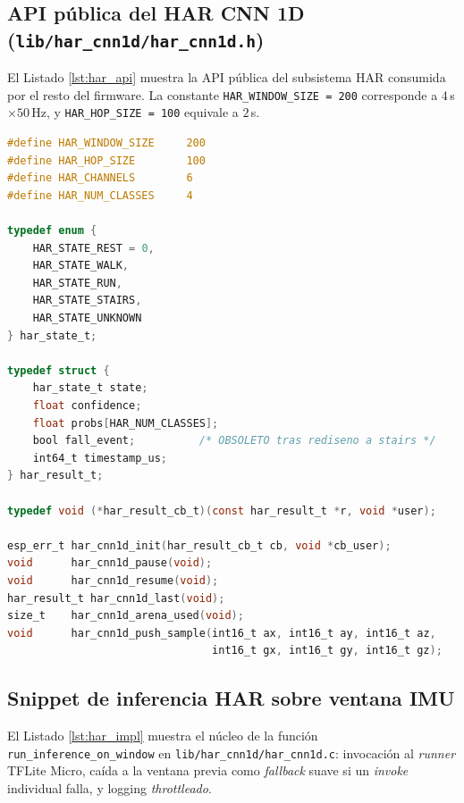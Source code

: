 \documentclass[letterpaper,11pt]{article}
\begin{document}
\subsection{API p\'ublica del HAR CNN 1D (\texttt{lib/har\_cnn1d/har\_cnn1d.h})}\label{sec:anexo_har_api}

El Listado \ref{lst:har_api} muestra la API p\'ublica del subsistema HAR consumida por el resto del firmware. La constante \texttt{HAR\_WINDOW\_SIZE = 200} corresponde a $4$\,s $\times 50$\,Hz, y \texttt{HAR\_HOP\_SIZE = 100} equivale a $2$\,s.

\begin{lstlisting}[language=C, caption={API p\'ublica del HAR CNN 1D.}, label={lst:har_api}]
#define HAR_WINDOW_SIZE     200
#define HAR_HOP_SIZE        100
#define HAR_CHANNELS        6
#define HAR_NUM_CLASSES     4

typedef enum {
    HAR_STATE_REST = 0,
    HAR_STATE_WALK,
    HAR_STATE_RUN,
    HAR_STATE_STAIRS,
    HAR_STATE_UNKNOWN
} har_state_t;

typedef struct {
    har_state_t state;
    float confidence;
    float probs[HAR_NUM_CLASSES];
    bool fall_event;          /* OBSOLETO tras rediseno a stairs */
    int64_t timestamp_us;
} har_result_t;

typedef void (*har_result_cb_t)(const har_result_t *r, void *user);

esp_err_t har_cnn1d_init(har_result_cb_t cb, void *cb_user);
void      har_cnn1d_pause(void);
void      har_cnn1d_resume(void);
har_result_t har_cnn1d_last(void);
size_t    har_cnn1d_arena_used(void);
void      har_cnn1d_push_sample(int16_t ax, int16_t ay, int16_t az,
                                int16_t gx, int16_t gy, int16_t gz);
\end{lstlisting}

\subsection{Snippet de inferencia HAR sobre ventana IMU}\label{sec:anexo_har_impl}

El Listado \ref{lst:har_impl} muestra el n\'ucleo de la funci\'on \texttt{run\_inference\_on\_window} en \texttt{lib/har\_cnn1d/har\_cnn1d.c}: invocaci\'on al \textit{runner} TFLite Micro, ca\'ida a la ventana previa como \textit{fallback} suave si un \textit{invoke} individual falla, y logging \textit{throttleado}.
\end{document}

